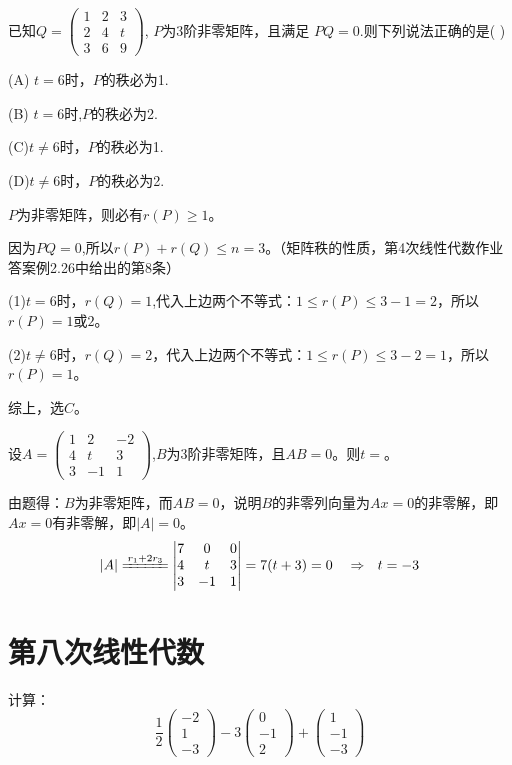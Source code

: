\documentclass[a4paper]{report}
\begin{document}
\EX 已知$Q=
\begin{pmatrix}
1&2&3\\
2&4&t\\
3&6&9
\end{pmatrix}
$,
$P$为3阶非零矩阵，且满足
$PQ=0$.则下列说法正确的是( )

(A) $t=6$时，$P$的秩必为1.

(B) $t=6$时,$P$的秩必为2.

(C)$t\neq 6$时，$P$的秩必为1.

(D)$t\neq6$时，$P$的秩必为2.

\begin{jie}
$P$为非零矩阵，则必有$r(P)\geq 1$。

因为$PQ=0$,所以$r(P)+r(Q)\leq n=3$。（矩阵秩的性质，第4次线性代数作业答案例2.26中给出的第8条）

(1)$t=6$时，$r(Q)=1$,代入上边两个不等式：$1\leq r(P)\leq 3-1=2$，所以$r(P)=1$或$2$。

(2)$t\neq 6$时，$r(Q)=2$，代入上边两个不等式：$1\leq r(P)\leq 3-2=1$，所以$r(P)=1$。

综上，选$C$。
\end{jie}

\EX 设$A=
\begin{pmatrix}
1&2&-2\\
4&t&3\\
3&-1&1
\end{pmatrix}
$,$B$为3阶非零矩阵，且$AB=0$。则$t=$\underline{\hphantom{~~~~~~~~}}。

\begin{jie}
由题得：$B$为非零矩阵，而$AB=0$，说明$B$的非零列向量为$Ax=0$的非零解，即$Ax=0$有非零解，即$|A|=0$。
\begin{equation*}
|A|\xlongequal{r_1+2r_3}
\begin{vmatrix}
7&0&0\\
4&t&3\\
3&-1&1
\end{vmatrix}=7(t+3)=0~~~\Rightarrow~~t=-3
\end{equation*}
\end{jie}
\chapter{第八次线性代数}
\EX 计算：
\begin{equation*}
\frac{1}{2}
\begin{pmatrix}
-2\\ 1\\ -3
\end{pmatrix}-3
\begin{pmatrix}
0\\ -1\\ 2
\end{pmatrix}+
\begin{pmatrix}
1\\ -1\\ -3
\end{pmatrix}
\end{equation*}
\end{document}
